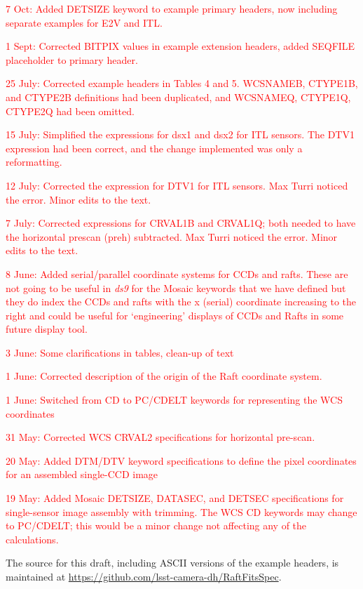 \documentclass{article}[12pt]
\newcommand{\red}{\textcolor{red}}
\begin{document}
\red{7 Oct:  Added DETSIZE keyword to example primary headers, now including separate examples for E2V and ITL.}

\red{1 Sept: Corrected BITPIX values in example extension headers, added SEQFILE placeholder to primary header.}

\red{25 July: Corrected example headers in Tables 4 and 5.  WCSNAMEB, CTYPE1B, and CTYPE2B definitions had been duplicated, and WCSNAMEQ, CTYPE1Q, CTYPE2Q had been omitted.}

\red{15 July: Simplified the expressions for dsx1 and dsx2 for ITL sensors.  The DTV1 expression had been correct, and the change implemented was only a reformatting.}
  
\red{12 July:  Corrected the expression for DTV1 for ITL sensors.  Max Turri noticed the error.  Minor edits to the text.}

\red{7 July:  Corrected expressions for CRVAL1B and CRVAL1Q; both needed to have the horizontal prescan (preh) subtracted.  Max Turri noticed the error.  Minor edits to the text.}

\red{8 June:  Added serial/parallel coordinate systems for CCDs and rafts.  These are not going to be useful in {\it ds9} for the Mosaic keywords that we have defined but they do index the CCDs and rafts with the x (serial) coordinate increasing to the right and could be useful for `engineering' displays of CCDs and Rafts in some future display tool.}  
 
\red{3 June:  Some clarifications in tables, clean-up of text}

\red{1 June:  Corrected description of the origin of the Raft coordinate system.}

\red{1 June:  Switched from CD to PC/CDELT keywords for representing the WCS coordinates} 

\red{31 May:  Corrected WCS CRVAL2 specifications for horizontal pre-scan.}

\red{20 May:  Added DTM/DTV keyword specifications to define the pixel coordinates for an assembled single-CCD image}

\red{19 May:  Added Mosaic DETSIZE, DATASEC, and DETSEC specifications for single-sensor image assembly with trimming.  The WCS CD keywords may change to PC/CDELT; this would be a minor change not affecting any of the calculations.}

The source for this draft, including ASCII versions of the example headers, is maintained at \url{https://github.com/lsst-camera-dh/RaftFitsSpec}.
\end{document}
